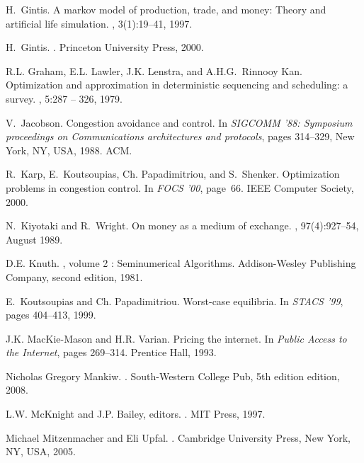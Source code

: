 \documentclass[letterpaper,10pt]{llncs}
\begin{document}
\begin{thebibliography}{1}
H.~Gintis.
\newblock A markov model of production, trade, and money: Theory and artificial
  life simulation.
, 3(1):19--41, 1997.

H.~Gintis.
.
\newblock Princeton University Press, 2000.

R.L. Graham, E.L. Lawler, J.K. Lenstra, and A.H.G.~Rinnooy Kan.
\newblock Optimization and approximation in deterministic sequencing and
  scheduling: a survey.
, 5:287 -- 326, 1979.

V.~Jacobson.
\newblock Congestion avoidance and control.
\newblock In {\em SIGCOMM '88: Symposium proceedings on Communications
  architectures and protocols}, pages 314--329, New York, NY, USA, 1988. ACM.

R.~Karp, E.~Koutsoupias, Ch. Papadimitriou, and S.~Shenker.
\newblock Optimization problems in congestion control.
\newblock In {\em FOCS '00}, page~66. IEEE Computer Society, 2000.

N.~Kiyotaki and R.~Wright.
\newblock On money as a medium of exchange.
, 97(4):927--54, August 1989.

D.E. Knuth.
, volume 2 : Seminumerical
  Algorithms.
\newblock Addison-Wesley Publishing Company, second edition, 1981.

E.~Koutsoupias and Ch. Papadimitriou.
\newblock Worst-case equilibria.
\newblock In {\em STACS '99}, pages 404--413, 1999.

J.K. MacKie-Mason and H.R. Varian.
\newblock Pricing the internet.
\newblock In {\em Public Access to the Internet}, pages 269--314. Prentice
  Hall, 1993.

{Nicholas Gregory} Mankiw.
.
\newblock South-Western College Pub, 5th edition edition, 2008.

L.W. McKnight and J.P. Bailey, editors.
.
\newblock MIT Press, 1997.

Michael Mitzenmacher and Eli Upfal.
.
\newblock Cambridge University Press, New York, NY, USA, 2005.


\end{thebibliography}
\end{document}
